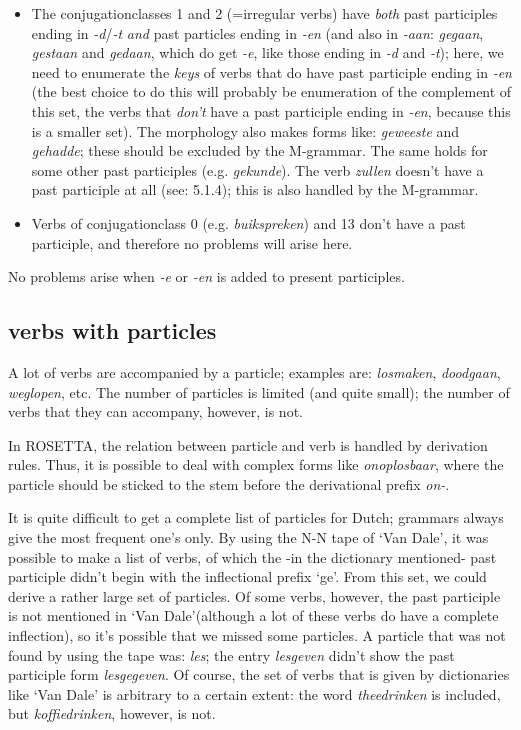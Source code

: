 \begin{itemize}
  \item The conjugationclasses 1 and 2 
        (=irregular verbs) have {\em both} past participles ending in 
        {\em -d}/{\em -t} {\em and} past particles ending in {\em -en}
        (and also in {\em -aan}: {\em gegaan}, {\em gestaan} and 
        {\em gedaan}, which do get {\em -e}, like those ending in 
        {\em -d} and {\em -t}); here, we need to enumerate the {\em keys} 
        of verbs that do have past participle ending
        in {\em -en} (the best choice to do this will probably be enumeration 
        of the complement of this set, the verbs that {\em don't} have a 
        past participle ending in {\em -en}, 
        because this is a smaller set). The morphology also makes forms like:
        {\em geweeste} and {\em gehadde}; these should be excluded by the 
        M-grammar. The same holds for some other past participles (e.g. 
        {\em gekunde}). The verb {\em zullen} doesn't have a past participle at 
        all (see: 5.1.4); this is also handled by the M-grammar.

  \item Verbs of conjugationclass 0 (e.g. {\em buikspreken}) and 13 don't 
        have a past participle, and therefore no problems will arise here.

\end{itemize}

No problems arise when {\em -e} or {\em -en} is added to present participles.

\subsection{verbs with particles}

A lot of verbs are accompanied by a particle; examples are: {\em losmaken}, 
{\em doodgaan}, {\em weglopen}, etc. The number of particles is limited
(and quite small); the number of verbs that they can accompany, however, is
not. 

In ROSETTA, the relation between particle and verb is handled by
derivation rules. Thus, it is possible to deal with complex forms like
{\em onoplosbaar}, where the particle should be sticked to the stem before the 
derivational prefix {\em on-}.

It is quite difficult to get a complete list of particles for Dutch; grammars
always give the most frequent one's only. By using the N-N tape of `Van Dale', 
it was possible to make a list of verbs, of which the -in the dictionary 
mentioned- past participle didn't begin with the inflectional prefix `ge'. 
From this set, we 
could derive a rather large set of particles. Of some verbs, however, the
past participle is not mentioned in `Van Dale'(although a lot of these verbs do 
have a complete inflection), so it's possible that we missed some particles.
A particle that was not found by using the tape was: {\em les}; 
the entry {\em lesgeven} didn't show the past participle form {\em lesgegeven}.
Of course, the set of verbs that is given by dictionaries like `Van Dale' is 
arbitrary to a certain extent: the word {\em theedrinken} is included, but 
{\em koffiedrinken}, however, is not.

